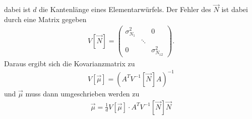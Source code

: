 dabei ist $d$ die Kantenlänge eines Elementarwürfels.
Der Fehler des $\vec{N}$ ist dabei durch eine Matrix gegeben
\begin{align}
	V[\vec{N}]=
	\begin{pmatrix}
		\sigma^2_{N_1} &  & 0\\
		 & \ddots & \\
		0 &  &\sigma^2_{N_{12}}	
	\end{pmatrix}.
\end{align}
Daraus ergibt sich die Kovarianzmatrix zu
\begin{align}
	V[\vec{\mu}]=\left(A^TV^{-1}[\vec{N}]A\right)^{-1}
	\label{eq:KleinsteQuadrateFehler}
\end{align}
und $\vec{\mu}$ muss dann umgeschrieben werden zu
\begin{align}
	\vec{\mu}=\frac{1}{d}V[\vec{\mu}]\cdot A^T V^{-1}[\vec{N}] \vec{N}
	\label{eq:KleinsteQuadrate}
\end{align}
\newpage
